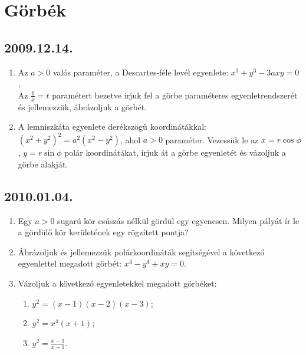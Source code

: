 \documentclass{article}
\begin{document}
\section*{Görbék}

\subsection*{2009.12.14.}
\begin{enumerate}
\item Az $a>0$ valós paraméter, a Descartes-féle levél egyenlete: $x^3+y^3-3axy=0$.
\\ Az $\frac{y}{x}=t$ paramétert bezetve írjuk fel a görbe paraméteres egyenletrendszerét és jellemezzük, ábrázoljuk a görbét.
\item A lemniszkáta egyenlete derékszögű koordinátákkal: $(x^2+y^2)^2=a^2(x^2-y^2)$, ahol $a>0$ paraméter. Vezessük le az $x=r\cos\phi$, $y=r\sin\phi$ polár koordinátákat, írjuk át a görbe egyenletét és vázoljuk a görbe alakját.
\end{enumerate}

\subsection*{2010.01.04.}
\begin{enumerate}
\item Egy $a>0$ sugarú kör csúszás nélkül gördül egy egyenesen. Milyen pályát ír le a gördülő kör kerületének egy rögzített pontja?
\item Ábrázoljuk és jellemezzük polárkoordináták segítségével a következő egyenlettel megadott görbét: $x^4-y^4+xy=0$.
\item Vázoljuk a következő egyenletekkel megadott görbéket:
\begin{enumerate}
\item $y^2=(x-1)(x-2)(x-3)$;
\item $y^2=x^4(x+1)$;
\item $y^2=\displaystyle \frac{x-1}{x+1}$.
\end{enumerate}
\end{enumerate}
\end{document}
